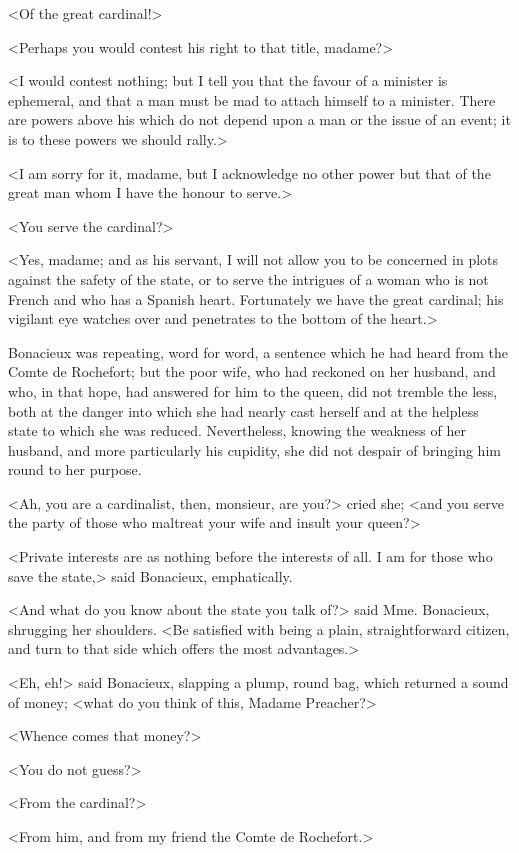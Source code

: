 <Of the great cardinal!> 

<Perhaps you would contest his right to that title, madame?> 

<I would contest nothing; but I tell you that the favour of a minister is ephemeral, and that a man must be mad to attach himself to a minister. There are powers above his which do not depend upon a man or the issue of an event; it is to these powers we should rally.> 

<I am sorry for it, madame, but I acknowledge no other power but that of the great man whom I have the honour to serve.> 

<You serve the cardinal?> 

<Yes, madame; and as his servant, I will not allow you to be concerned in plots against the safety of the state, or to serve the intrigues of a woman who is not French and who has a Spanish heart. Fortunately we have the great cardinal; his vigilant eye watches over and penetrates to the bottom of the heart.> 

Bonacieux was repeating, word for word, a sentence which he had heard from the Comte de Rochefort; but the poor wife, who had reckoned on her husband, and who, in that hope, had answered for him to the queen, did not tremble the less, both at the danger into which she had nearly cast herself and at the helpless state to which she was reduced. Nevertheless, knowing the weakness of her husband, and more particularly his cupidity, she did not despair of bringing him round to her purpose. 

<Ah, you are a cardinalist, then, monsieur, are you?> cried she; <and you serve the party of those who maltreat your wife and insult your queen?> 

<Private interests are as nothing before the interests of all. I am for those who save the state,> said Bonacieux, emphatically. 

<And what do you know about the state you talk of?> said Mme. Bonacieux, shrugging her shoulders. <Be satisfied with being a plain, straightforward citizen, and turn to that side which offers the most advantages.> 

<Eh, eh!> said Bonacieux, slapping a plump, round bag, which returned a sound of money; <what do you think of this, Madame Preacher?> 

<Whence comes that money?> 

<You do not guess?> 

<From the cardinal?> 

<From him, and from my friend the Comte de Rochefort.> 


